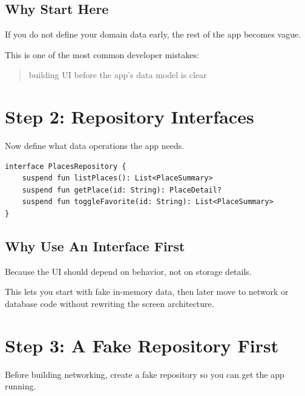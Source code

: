 \documentclass[11pt,a4paper]{article}
\begin{document}
\subsection{Why Start Here}

If you do not define your domain data early, the rest of the app becomes vague.

This is one of the most common developer mistakes:
\begin{quote}
building UI before the app's data model is clear
\end{quote}

\section{Step 2: Repository Interfaces}

Now define what data operations the app needs.

\begin{lstlisting}[style=kazekotlin]
interface PlacesRepository {
    suspend fun listPlaces(): List<PlaceSummary>
    suspend fun getPlace(id: String): PlaceDetail?
    suspend fun toggleFavorite(id: String): List<PlaceSummary>
}
\end{lstlisting}

\subsection{Why Use An Interface First}

Because the UI should depend on behavior, not on storage details.

This lets you start with fake in-memory data, then later move to network or database code without rewriting the screen architecture.

\section{Step 3: A Fake Repository First}

Before building networking, create a fake repository so you can get the app running.
\end{document}
